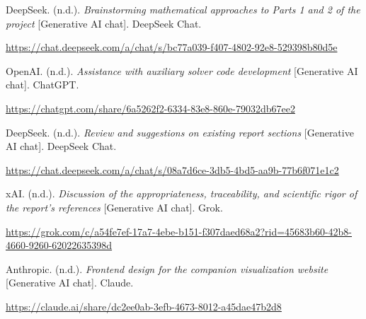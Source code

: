 \documentclass[11pt,a4paper]{article}
\begin{document}
\begin{list}{}{
  \setlength{\labelwidth}{0pt}
  \setlength{\labelsep}{0pt}
  \setlength{\leftmargin}{2em}
  \setlength{\itemindent}{-2em}
  \setlength{\itemsep}{0.9\baselineskip}
  \setlength{\parsep}{0pt}
  \setlength{\topsep}{0.5\baselineskip}
}

\item
DeepSeek. (n.d.). \textit{Brainstorming mathematical approaches to Parts 1 and
2 of the project} [Generative AI chat]. DeepSeek Chat.
\par
\url{https://chat.deepseek.com/a/chat/s/bc77a039-f407-4802-92e8-529398b80d5e}

\item
OpenAI. (n.d.). \textit{Assistance with auxiliary solver code development}
[Generative AI chat]. ChatGPT.
\par
\url{https://chatgpt.com/share/6a5262f2-6334-83e8-860e-79032db67ee2}

\item
DeepSeek. (n.d.). \textit{Review and suggestions on existing report sections}
[Generative AI chat]. DeepSeek Chat.
\par
\url{https://chat.deepseek.com/a/chat/s/08a7d6ce-3db5-4bd5-aa9b-77b6f071e1c2}

\item
xAI. (n.d.). \textit{Discussion of the appropriateness, traceability, and
scientific rigor of the report's references} [Generative AI chat]. Grok.
\par
\url{https://grok.com/c/a54fe7ef-17a7-4ebe-b151-f307daed68a2?rid=45683b60-42b8-4660-9260-62022635398d}

\item
Anthropic. (n.d.). \textit{Frontend design for the companion visualization
website} [Generative AI chat]. Claude.
\par
\url{https://claude.ai/share/dc2ee0ab-3efb-4673-8012-a45dae47b2d8}

\end{list}

\endgroup
\end{document}
